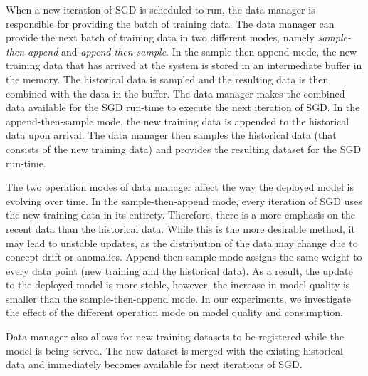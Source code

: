 When a new iteration of SGD is scheduled to run, the data manager is responsible for providing the batch of training data.
The data manager can provide the next batch of training data in two different modes, namely \textit{sample-then-append} and \textit{append-then-sample}.
In the sample-then-append mode, the new training data that has arrived at the system is stored in an intermediate buffer in the memory.
The historical data is sampled and the resulting data is then combined with the data in the buffer.
The data manager makes the combined data available for the SGD run-time to execute the next iteration of SGD.
In the append-then-sample mode, the new training data is appended to the historical data upon arrival.
The data manager then samples the historical data (that consists of the new training data) and provides the resulting dataset for the SGD run-time.

The two operation modes of data manager affect the way the deployed model is evolving over time.
In the sample-then-append mode, every iteration of SGD uses the new training data in its entirety.
Therefore, there is a more emphasis on the recent data than the historical data.
While this is the more desirable method, it may lead to unstable updates, as the distribution of the data may change due to concept drift or anomalies.
Append-then-sample mode assigns the same weight to every data point (new training and the historical data).
As a result, the update to the deployed model is more stable, however, the increase in model quality is smaller than the sample-then-append mode.
In our experiments, we investigate the effect of the different operation mode on model quality and consumption.


Data manager also allows for new training datasets to be registered while the model is being served.
The new dataset is merged with the existing historical data and immediately becomes available for next iterations of SGD.

